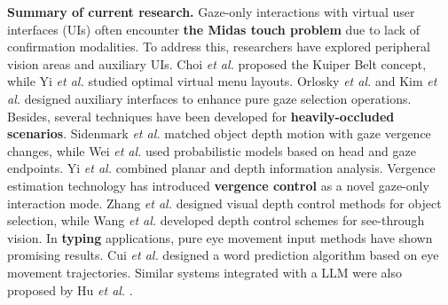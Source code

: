 \documentclass[review]{fcs}
\newcommand{\revise}[2]{\textcolor[rgb]{0,0,0}{#2}}
\begin{document}
\textbf{Summary of current research.} Gaze-only interactions with virtual user interfaces (UIs) often encounter \textbf{the Midas touch problem} due to lack of confirmation modalities. 
To address this, researchers have explored peripheral vision areas and auxiliary UIs. 
\revise{Choi \textit{et al.} proposed the Kuiper Belt concept \cite{DBLP:conf/chi/ChoiSO22}, while Yi \textit{et al.} studied optimal virtual menu layouts \cite{DBLP:conf/vr/0001LC00S22}.}{Choi \textit{et al.} \cite{DBLP:conf/chi/ChoiSO22} proposed the Kuiper Belt concept, while Yi \textit{et al.} \cite{DBLP:conf/vr/0001LC00S22} studied optimal virtual menu layouts.} Orlosky \textit{et al.} \cite{DBLP:conf/vr/OrloskyLSSM24} and Kim \textit{et al.} \cite{kim2022lattice} designed auxiliary interfaces to enhance pure gaze selection operations.
Besides, several techniques have been developed for \textbf{heavily-occluded scenarios}. 
\revise{Sidenmark \textit{et al.} matched object depth motion with gaze vergence changes \cite{DBLP:conf/chi/SidenmarkCNLPG23}, while Wei \textit{et al.} used probabilistic models based on head and gaze endpoints \cite{DBLP:conf/chi/WeiSYW0YL23}. Yi \textit{et al.} combined planar and depth information analysis \cite{DBLP:conf/uist/0001QTFLS22}.}{Sidenmark \textit{et al.} \cite{DBLP:conf/chi/SidenmarkCNLPG23} matched object depth motion with gaze vergence changes, while Wei \textit{et al.} \cite{DBLP:conf/chi/WeiSYW0YL23} used probabilistic models based on head and gaze endpoints. Yi \textit{et al.} \cite{DBLP:conf/uist/0001QTFLS22} combined planar and depth information analysis.}
Vergence estimation technology has introduced \textbf{vergence control} as a novel gaze-only interaction mode. 
\revise{Zhang \textit{et al.} designed visual depth control methods for object selection \cite{DBLP:conf/chi/ZhangCSS24}, while Wang \textit{et al.} developed depth control schemes for see-through vision.}{Zhang \textit{et al.} \cite{DBLP:conf/chi/ZhangCSS24} designed visual depth control methods for object selection, while Wang \textit{et al.} \cite{DBLP:journals/tvcg/WangZ022} developed depth control schemes for see-through vision.}
In \textbf{typing} applications, pure eye movement input methods have shown promising results. 
\revise{Cui \textit{et al.} designed a word prediction algorithm based on eye movement trajectories \cite{cui2023glancewriter}.}{Cui \textit{et al.} \cite{cui2023glancewriter} designed a word prediction algorithm based on eye movement trajectories.} Similar systems integrated with a LLM were also proposed by Hu \textit{et al.} \cite{DBLP:conf/vr/HuDK24}.
\end{document}
